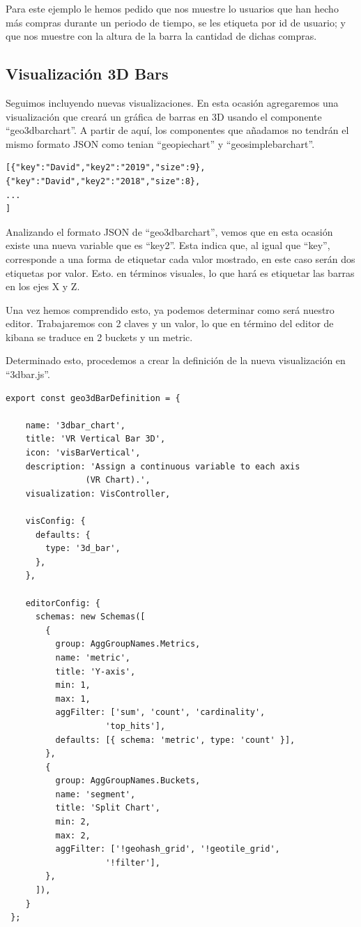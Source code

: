 \documentclass[a4paper, 12pt]{book}
\begin{document}
Para este ejemplo le hemos pedido que nos muestre lo usuarios que han hecho más compras durante un periodo de tiempo, se les etiqueta por id de usuario; y que nos muestre con la altura de la barra la cantidad de dichas compras.

\subsection{Visualización 3D Bars}

Seguimos incluyendo nuevas visualizaciones. En esta ocasión agregaremos una visualización que creará un gráfica de barras en 3D usando el componente “geo3dbarchart”. A partir de aquí, los componentes que añadamos no tendrán el mismo formato JSON como tenian “geopiechart” y “geosimplebarchart”.

\begin{lstlisting}[frame=single]
[{"key":"David","key2":"2019","size":9},
{"key":"David","key2":"2018","size":8},
...
]
\end{lstlisting}

Analizando el formato JSON de “geo3dbarchart”, vemos que en esta ocasión existe una nueva variable que es “key2”. Esta indica que, al igual que “key”, corresponde a una forma de etiquetar cada valor mostrado, en este caso serán dos etiquetas por valor. Esto. en términos visuales, lo que hará es etiquetar las barras en los ejes X y Z. 

Una vez hemos comprendido esto, ya podemos determinar como será nuestro editor. Trabajaremos con 2 claves y un valor, lo que en término del editor de kibana se traduce en 2 buckets y un metric. 

Determinado esto, procedemos a crear la definición de la nueva visualización en “3dbar.js”.

\begin{lstlisting}[frame=single]
export const geo3dBarDefinition = {

    name: '3dbar_chart',
    title: 'VR Vertical Bar 3D',
    icon: 'visBarVertical',
    description: 'Assign a continuous variable to each axis 
                (VR Chart).',
    visualization: VisController,

    visConfig: {
      defaults: {
        type: '3d_bar',
      },
    },

    editorConfig: {
      schemas: new Schemas([
        {
          group: AggGroupNames.Metrics,
          name: 'metric',
          title: 'Y-axis',
          min: 1,
          max: 1,
          aggFilter: ['sum', 'count', 'cardinality',
                    'top_hits'],
          defaults: [{ schema: 'metric', type: 'count' }],
        },
        {
          group: AggGroupNames.Buckets,
          name: 'segment',
          title: 'Split Chart',
          min: 2,
          max: 2,
          aggFilter: ['!geohash_grid', '!geotile_grid', 
                    '!filter'],
        },
      ]),
    }
 };
\end{lstlisting}
\end{document}
